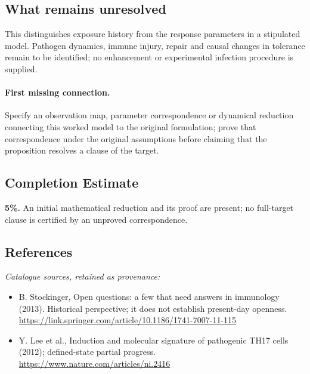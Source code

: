 \documentclass[11pt]{article}
\begin{document}
\subsection{What remains unresolved}
This distinguishes exposure history from the response parameters in a stipulated model. Pathogen dynamics, immune injury, repair and causal changes in tolerance remain to be identified; no enhancement or experimental infection procedure is supplied.
\paragraph{First missing connection.} Specify an observation map, parameter correspondence or dynamical reduction connecting this worked model to the original formulation; prove that correspondence under the original assumptions before claiming that the proposition resolves a clause of the target.
\subsection{Completion Estimate}
\textbf{5\%.} An initial mathematical reduction and its proof are present; no full-target clause is certified by an unproved correspondence.
\subsection{References}
\noindent\emph{Catalogue sources, retained as provenance:}
\begin{itemize}
\item B. Stockinger, Open questions: a few that need answers in immunology (2013). Historical perspective; it does not establish present-day openness. \url{https://link.springer.com/article/10.1186/1741-7007-11-115}
\item Y. Lee et al., Induction and molecular signature of pathogenic TH17 cells (2012); defined-state partial progress. \url{https://www.nature.com/articles/ni.2416}
\end{itemize}
\clearpage


\appendix
\end{document}
